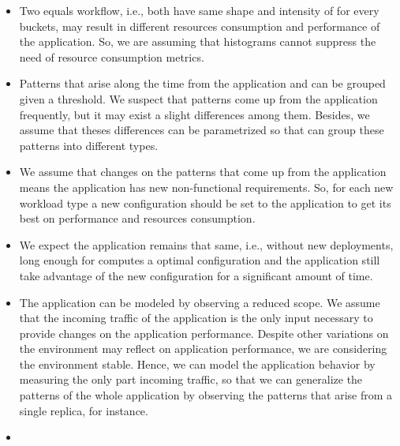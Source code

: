 \begin{itemize}
\item Two equals workflow, i.e., both have same shape and intensity of for every
  buckets, may result in different resources consumption and performance of the
    application. So, we are assuming that histograms cannot suppress the need of
    resource consumption metrics.

\item Patterns that arise along the time from the application and can be grouped
  given a threshold. We suspect that patterns come up from the application
    frequently, but it may exist a slight differences among them. Besides, we
    assume that theses differences can be parametrized so that \name can group
    these patterns into different types.  

\item We assume that changes on the patterns that come up from the application
  means the application has new non-functional requirements. So, for each new
    workload type a new configuration should be set to the application to get
    its best on performance and resources consumption. 

\item We expect the application remains that same, i.e., without new
  deployments, long enough for \name computes a optimal configuration and the
    application still take advantage of the new configuration for a significant
    amount of time.

\item The application can be modeled by observing a reduced scope. We assume
  that the incoming traffic of the application is the only input necessary to
    provide changes on the application performance. Despite other variations on
    the environment may reflect on application performance, we are considering
    the environment stable. Hence, we can model the application behavior by
    measuring the only part incoming traffic, so that we can generalize the
    patterns of the whole application by observing the patterns that arise from
    a single replica, for instance. 

  \item {}

\end{itemize}

